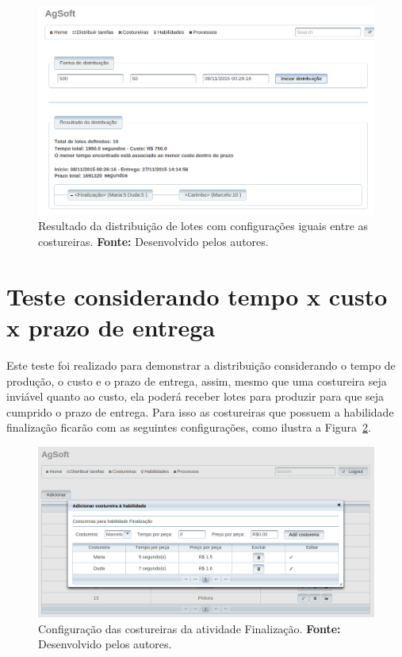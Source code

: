 \begin{figure}[h!]
	\centerline{\includegraphics[width=14.7cm]{./imagens/resultado_tudo_igual_teste2.png}}
	\caption[Resultado da distribuição de lotes com configurações iguais entre as
	costureiras.] 
	{Resultado da distribuição de lotes com configurações iguais entre as
	costureiras. \textbf{Fonte:}
	Desenvolvido pelos autores.}
	\label{fig:resultado_tudo_igual}
\end{figure}

\section{Teste considerando tempo x custo x prazo de entrega}

\par Este teste foi realizado para demonstrar a distribuição considerando o tempo de
produção, o custo e o prazo de entrega, assim, mesmo que uma costureira seja
inviável quanto ao custo, ela poderá receber lotes para produzir para que seja cumprido o prazo 
de entrega. Para isso as costureiras que possuem a habilidade finalização
ficarão com as seguintes configurações, como ilustra a
Figura~\ref{fig:configuracao_habilidade_costureira_teste3}.

\begin{figure}[h!]
	\centerline{\includegraphics[width=14.7cm]{./imagens/cofiguracao_habilidade_teste3.png}}
	\caption[Configuração das costureiras da atividade Finalização.]
	{Configuração das costureiras da atividade Finalização. \textbf{Fonte:}
	Desenvolvido pelos autores.}
	\label{fig:configuracao_habilidade_costureira_teste3}
\end{figure}


